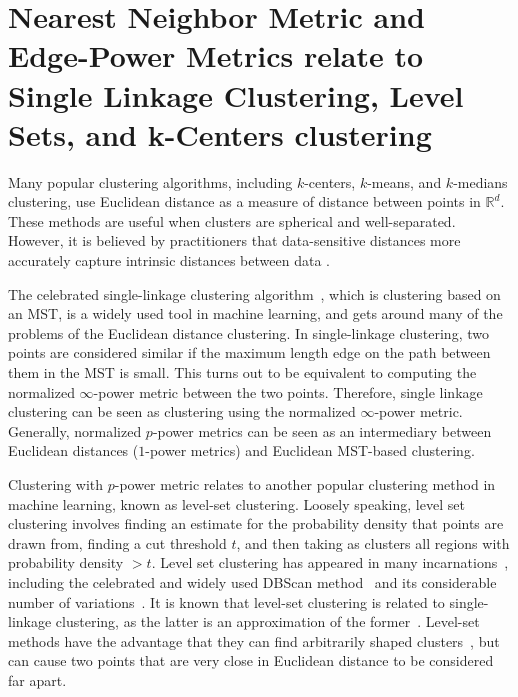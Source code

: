   \section{Nearest Neighbor Metric and Edge-Power Metrics relate to Single Linkage Clustering, Level Sets, and k-Centers
  clustering}\label{ap:clustering-link}

  Many popular clustering algorithms, including $k$-centers, $k$-means,
  and $k$-medians clustering, use Euclidean distance as a measure of
  distance between points in $\mathbb{R}^d$. These methods are useful
  when clusters are spherical and well-separated. However, it is believed by
  practitioners that
  data-sensitive distances more accurately capture intrinsic
  distances between data \cite{alamgir12shortest}.

  The celebrated single-linkage clustering algorithm~\cite{Gower1969, Yaro2017},
  which is clustering based on an MST, is a widely used tool in
  machine learning, and gets around many of the problems of the
 Euclidean distance clustering. In single-linkage clustering,
   two points are considered similar if the maximum length
   edge on the path between them in the MST is small. This turns out to be equivalent to 
  computing the normalized $\infty$-power metric between the two
  points. Therefore, single linkage clustering can be seen
  as clustering using the normalized $\infty$-power metric.
  Generally, normalized $p$-power metrics can be seen as an
  intermediary between Euclidean distances ($1$-power metrics) and
  Euclidean MST-based clustering.

  Clustering with $p$-power metric relates to another popular
 clustering method in machine learning, known as level-set clustering.
  Loosely speaking, level set clustering involves finding an estimate
  for the probability density that points are drawn from, finding a
  cut threshold $t$, and then taking as clusters all regions with
  probability density $ > t$. Level set clustering
  has appeared in many incarnations~\cite{Wishart69, Stuetzle2003, Stuetzle2007}, including the celebrated and
  widely used DBScan method~\cite{Ester1996} and its
  considerable number of variations~\cite{OPTICS96}.
It is known
  that level-set clustering is related to single-linkage clustering, as
  the latter is an approximation of the former~\cite{Wishart69,
  Stuetzle2007}.  
  Level-set methods
  have the advantage that they can find arbitrarily shaped
  clusters~\cite{Ester1996}, but can cause two points that are very
  close in Euclidean distance to be considered far apart. 

